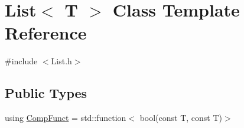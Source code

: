 \hypertarget{class_list}{}\section{List$<$ T $>$ Class Template Reference}
\label{class_list}


{\ttfamily \#include $<$List.\+h$>$}

\subsection*{Public Types}
\begin{DoxyCompactItemize}
\item 
using \hyperlink{class_list_ae43380038701ec3a2fbecaf31f37dd19}{Comp\+Funct} = std\+::function$<$ bool(const T, const T)$>$
\end{DoxyCompactItemize}

